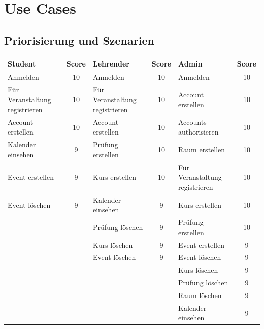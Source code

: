 \documentclass[a4paper,12pt]{article}
\begin{document}
\section*{Use Cases}
	\subsection*{Priorisierung und Szenarien}
	\begin{tabular}{|p{3cm}|c|p{3cm}|c|p{3cm}|c|}
		\hline
		\textbf{Student} & \textbf{Score} & \textbf{Lehrender} & \textbf{Score} & \textbf{Admin} & \textbf{Score} \\ \hline
		Anmelden & 10 & Anmelden & 10 & Anmelden & 10 \\ \hline
		Für Veranstaltung registrieren & 10 & Für Veranstaltung registrieren & 10 & Account erstellen & 10 \\ \hline
		Account erstellen & 10 & Account erstellen & 10 & Accounts authorisieren & 10 \\ \hline
		Kalender einsehen & 9 & Prüfung erstellen & 10 & Raum erstellen &  10 \\ \hline
		Event erstellen & 9 & Kurs erstellen & 10 & Für Veranstaltung registrieren  & 10  \\ \hline
		Event löschen & 9 & Kalender einsehen & 9 & Kurs erstellen & 10 \\ \hline
		&& Prüfung löschen & 9 & Prüfung erstellen & 10 \\ \hline
		&& Kurs löschen & 9 & Event erstellen & 9 \\ \hline
		&& Event löschen & 9 & Event löschen & 9 \\ \hline
		&&&& Kurs löschen & 9 \\ \hline
		&&&& Prüfung löschen & 9 \\ \hline
		&&&& Raum löschen & 9 \\ \hline
		&&&& Kalender einsehen & 9 \\ \hline
	\end{tabular}
	\newpage
\end{document}
